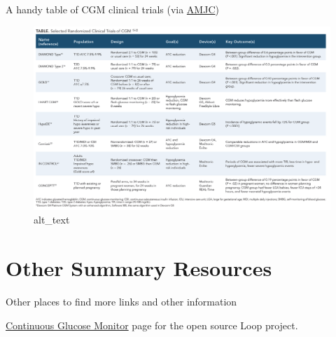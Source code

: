 \documentclass[
]{book}
\begin{document}
A handy table of CGM clinical trials (via \href{https://www.ajmc.com/journals/evidence-based-diabetes-management/2019/march-2019/continuous-glucose-monitoring-an-emerging-standard-of-care?p=2}{AMJC})

\begin{figure}
\centering
\includegraphics{images/AMJC-clinical-trials.png}
\caption{alt\_text}
\end{figure}

\hypertarget{other-summary-resources}{%
\chapter{Other Summary Resources}\label{other-summary-resources}}

Other places to find more links and other information

\href{https://loopkit.github.io/loopdocs/setup/requirements/cgm/\#continuous-glucose-monitor}{Continuous Glucose Monitor} page for the open source Loop project.

  
\end{document}
